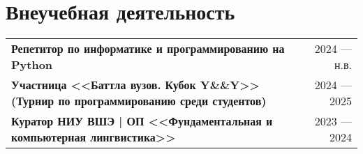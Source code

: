 \documentclass[a4paper,10pt]{article}
\begin{document}
\section{Внеучебная деятельность}

\begin{tabularx}{\linewidth}{ @{}l r@{} }
\textbf{Репетитор по информатике и программированию на Python} & \hfill 2024 –– н.в. \\[3.75pt]

\textbf{Участница <<Баттла вузов. Кубок Y\&\&Y>> (Турнир по программированию среди студентов)} & \hfill 2024 –– 2025 \\[3.75pt]

\textbf{Куратор НИУ ВШЭ | ОП <<Фундаментальная и компьютерная лингвистика>>} & \hfill 2023 –– 2024 \\ [3.75pt]

\end{tabularx}


\end{document}
